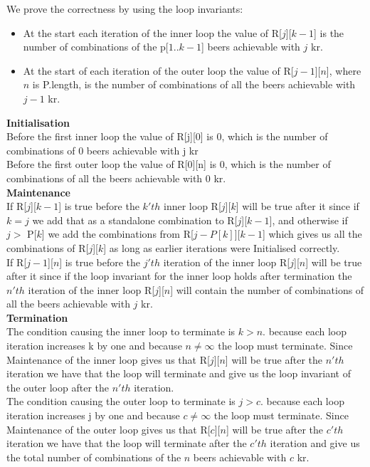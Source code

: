 \documentclass[12pt]{article}
\begin{document}
We prove the correctness by using the loop invariants:
\begin{itemize}
\item At the start each iteration of the inner loop the value of R[$j$][$k-1$] is the number of combinations of the p[$1..k-1$] beers achievable with $j$ kr.
\item At the start of each iteration of the outer loop the value of R[$j-1$][$n$], where $n$ is P.length, is the number of combinations of all the beers achievable with $j-1$ kr.

\end{itemize}

\textbf{Initialisation}\\
Before the first inner loop the value of R[j][0] is 0, which is the number of combinations of 0 beers achievable with j kr\\

Before the first outer loop the value of R[0][n] is 0, which is the number of combinations of all the beers achievable with 0 kr.\\

\textbf{Maintenance}\\

If R[$j$][$k-1$] is true before the $k'th$ inner loop R[$j$][$k$] will be true after it since if $k = j$ we add that as a standalone combination to R[$j$][$k-1$], and otherwise if $j>$ P[$k$] we add the combinations from R[$j-P[k]$][$k-1$] which gives us all the combinations of R[$j$][$k$] as long as earlier iterations were Initialised correctly.\\

If R[$j-1$][$n$] is true before the $j'th$ iteration of the inner loop R[$j$][$n$] will be true after it since if the loop invariant for the inner loop holds after termination the $n'th$ iteration of the inner loop R[$j$][$n$] will contain the number of combinations of all the beers achievable with $j$ kr.\\

\textbf{Termination}\\

The condition causing the inner loop to terminate is $k > n$. because each loop iteration increases k by one and because $n \neq \infty$ the loop must terminate. Since Maintenance of the inner loop gives us that R[$j$][$n$] will be true after the $n'th$ iteration we have that the loop will terminate and give us the loop invariant of the outer loop after the $n'th$ iteration.\\

The condition causing the outer loop to terminate is $j > c$. because each loop iteration increases j by one and because $c \neq \infty$ the loop must terminate. Since Maintenance of the outer loop gives us that R[$c$][$n$] will be true after the $c'th$ iteration we have that the loop will terminate after the $c'th$  iteration and give us the total number of combinations of the $n$ beers achievable with $c$ kr.\\



\end{document}
